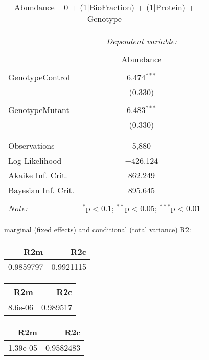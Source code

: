 \documentclass[11pt]{report}
\begin{document}
\begin{table}[!htbp] \centering 
  \caption{Abundance ~ 0 + (1|BioFraction) + (1|Protein) + Genotype} 
  \label{} 
\begin{tabular}{@{\extracolsep{5pt}}lc} 
\\[-1.8ex]\hline 
\hline \\[-1.8ex] 
 & \multicolumn{1}{c}{\textit{Dependent variable:}} \\ 
\cline{2-2} 
\\[-1.8ex] & Abundance \\ 
\hline \\[-1.8ex] 
 GenotypeControl & 6.474$^{***}$ \\ 
  & (0.330) \\ 
  & \\ 
 GenotypeMutant & 6.483$^{***}$ \\ 
  & (0.330) \\ 
  & \\ 
\hline \\[-1.8ex] 
Observations & 5,880 \\ 
Log Likelihood & $-$426.124 \\ 
Akaike Inf. Crit. & 862.249 \\ 
Bayesian Inf. Crit. & 895.645 \\ 
\hline 
\hline \\[-1.8ex] 
\textit{Note:}  & \multicolumn{1}{r}{$^{*}$p$<$0.1; $^{**}$p$<$0.05; $^{***}$p$<$0.01} \\ 
\end{tabular} 
\end{table} 
marginal (fixed effects) and conditional (total variance) R2:

\begin{tabular}{r|r}
\hline
R2m & R2c\\
\hline
0.9859797 & 0.9921115\\
\hline
\end{tabular}

\begin{tabular}{r|r}
\hline
R2m & R2c\\
\hline
8.6e-06 & 0.989517\\
\hline
\end{tabular}

\begin{tabular}{r|r}
\hline
R2m & R2c\\
\hline
1.39e-05 & 0.9582483\\
\hline
\end{tabular}
\end{document}
